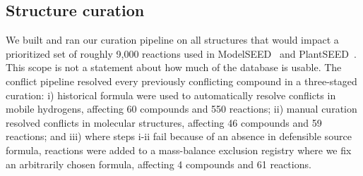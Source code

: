 \subsection{Structure curation}\label{sec:results-structure}

We built and ran our curation pipeline on all structures that would impact a prioritized set of roughly 9,000 reactions used in ModelSEED~\cite{henry2010,faria2023} and PlantSEED~\cite{seaver2014,seaver2018}.
This scope is not a statement about how much of the database is usable.
The conflict pipeline resolved every previously conflicting compound in a three-staged curation: i) historical formula were used to automatically resolve conflicts in mobile hydrogens, affecting 60 compounds and 550 reactions; ii) manual curation resolved conflicts in molecular structures, affecting 46 compounds and 59 reactions; and iii) where steps i-ii fail because of an absence in defensible source formula, reactions were added to a mass-balance exclusion registry where we fix an arbitrarily chosen formula, affecting 4 compounds and 61 reactions.